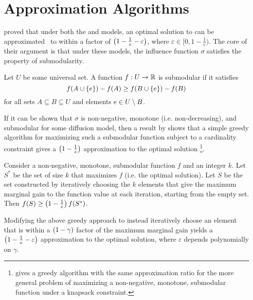 \section{Approximation Algorithms}
\citet{kempe2003maximizing} proved that under both the \ltmodel{} and \icmodel{} models, an optimal solution to \infmax{} can be approximated \
to within a factor of $\left( 1 - \frac{1}{e} - \varepsilon \right)$, where $\varepsilon \in [0, 1 - \frac{1}{e})$. The core of their argument is that
under these models, the influence function $\sigma$ satisfies the property of submodularity. 

\begin{definition}[Submodularity]
    \label{def:submod}
    Let $U$ be some universal set. A function $f: U \rightarrow \mathbb{R}$ is submodular if it satisfies 
    \begin{equation}
        f \! \left( A \cup \left\{ e \right\} \right) - f \! \left( A \right) \geq  f \! \left( B \cup \left\{ e \right\} \right) - f \! \left( B \right)
        \label{eq:submod}
    \end{equation} 
    for all sets $A \subseteq B \subseteq U$ and elements $e \in U \setminus B$. 
\end{definition}

If it can be shown that $\sigma$ is non-negative, monotone (i.e.\! non-decreasing), and submodular for some diffusion model, then a result by \citet{nemhauser1978analysis} shows that a simple greedy algorithm for maximizing such a submodular function subject to a cardinality constraint gives a $\left( 1 - \frac{1}{e} \right)$ approximation 
to the optimal solution \footnote{\cite{sviridenko2004note} gives a greedy algorithm with the same approximation ratio for the more general problem of maximizing a non-negative, monotone, submodular function under a knapsack constraint.}. 

\begin{theorem}
    Consider a non-negative, monotone, submodular function $f$ and an integer $k$. Let $S^*$ be the set of size $k$ that maximizes $f$ (i.e.\! the optimal solution). 
    Let $S$ be the set constructed by iteratively choosing the $k$ elements that give the maximum marginal gain to the function value at each iteration, starting from the empty set. Then $f \! \left( S \right) \geq \left( 1 - \frac{1}{e} \right)f \! \left( S^* \right)$. 
    \label{thm:submod_cardin}
\end{theorem}

Modifying the above greedy approach to instead iteratively choose an element that is within a $\left( 1-\gamma \right)$ factor of the 
maximum marginal gain yields a $\left( 1 - \frac{1}{e} - \varepsilon \right)$ approximation to the optimal solution, where $\varepsilon$ depends 
polynomially on $\gamma$. 

